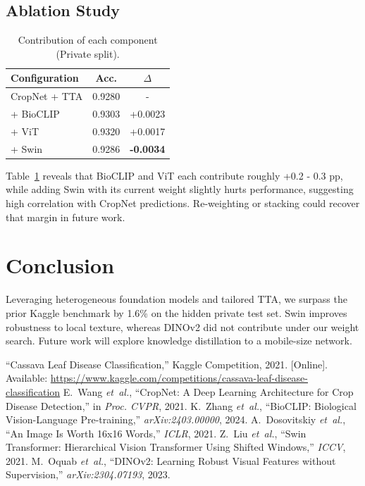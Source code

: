 \documentclass[10pt,conference]{IEEEtran}
\begin{document}
\subsection{Ablation Study}
\begin{table}[h]
\caption{Contribution of each component (Private split).}
\centering
\begin{tabular}{lcc}
\toprule
Configuration & Acc. & $\Delta$\\
\midrule
CropNet + TTA & 0.9280 & -\\
+ BioCLIP & 0.9303 & +0.0023\\
+ ViT & 0.9320 & +0.0017\\
+ Swin & 0.9286 & \textbf{-0.0034}\\
\bottomrule
\end{tabular}
\label{tab:contribution}
\end{table}
Table~\ref{tab:contribution} reveals that BioCLIP and ViT each contribute roughly +0.2 - 0.3 pp,
while adding Swin with its current weight slightly hurts performance,
suggesting high correlation with CropNet predictions.  Re-weighting or
stacking could recover that margin in future work.

\section{Conclusion}
Leveraging heterogeneous foundation models and tailored TTA, we surpass the prior Kaggle benchmark by 1.6\% on the hidden private test set.  Swin improves robustness to local texture, whereas DINOv2 did not contribute under our weight search.  Future work will explore knowledge distillation to a mobile-size network.


\begin{thebibliography}{99}
``Cassava Leaf Disease Classification,'' Kaggle Competition, 2021. [Online]. Available: \url{https://www.kaggle.com/competitions/cassava-leaf-disease-classification}
E.~Wang \emph{et~al.}, ``CropNet: A Deep Learning Architecture for Crop Disease Detection,'' in \emph{Proc. CVPR}, 2021.
K.~Zhang \emph{et~al.}, ``BioCLIP: Biological Vision-Language Pre-training,'' \emph{arXiv:2403.00000}, 2024.
A.~Dosovitskiy \emph{et~al.}, ``An Image Is Worth 16x16 Words,'' \emph{ICLR}, 2021.
Z.~Liu \emph{et~al.}, ``Swin Transformer: Hierarchical Vision Transformer Using Shifted Windows,'' \emph{ICCV}, 2021.
M.~Oquab \emph{et~al.}, ``DINOv2: Learning Robust Visual Features without Supervision,'' \emph{arXiv:2304.07193}, 2023.
\end{thebibliography}
\end{document}
